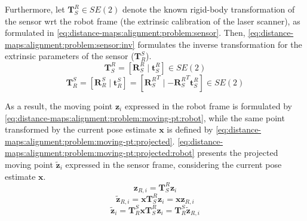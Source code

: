Furthermore, let $\mathbf{T}_S^R \in SE(2)$ denote the known rigid-body
transformation of the sensor \gls{wrt} the robot frame (the extrinsic
calibration of the laser scanner), as formulated in
\eqref{eq:distance-maps:alignment:problem:sensor}. Then,
\eqref{eq:distance-maps:alignment:problem:sensor:inv} formulates the inverse
transformation for the extrinsic parameters of the sensor ($\mathbf{T}_R^S$).
\begin{equation}
\label{eq:distance-maps:alignment:problem:sensor}
\mathbf{T}_S^R = \left[\mathbf{R}_S^R \mid \mathbf{t}_S^R\right] \in SE(2)
\end{equation}
\begin{equation}
\label{eq:distance-maps:alignment:problem:sensor:inv}
\mathbf{T}_R^S =
\left[\mathbf{R}_R^S \mid \mathbf{t}_R^S\right] =
\left[{\mathbf{R}_S^R}^T \mid -{\mathbf{R}_S^R}^T\mathbf{t}_S^R\right]
\in SE(2)
\end{equation}

As a result, the moving point $\mathbf{z}_i$ expressed in the robot frame is
formulated by \eqref{eq:distance-maps:alignment:problem:moving-pt:robot}, while
the same point transformed by the current pose estimate $\mathbf{x}$ is defined
by \eqref{eq:distance-maps:alignment:problem:moving-pt:projected}.
\eqref{eq:distance-maps:alignment:problem:moving-pt:projected:robot}
presents the projected moving point $\tilde{\mathbf{z}}_{i}$ expressed in the
sensor frame, considering the current pose estimate $\mathbf{x}$.
\begin{equation}
\label{eq:distance-maps:alignment:problem:moving-pt:robot}
\mathbf{z}_{R,i} = \mathbf{T}_S^R \mathbf{z}_i
\end{equation}
\begin{equation}
\label{eq:distance-maps:alignment:problem:moving-pt:projected}
\tilde{\mathbf{z}}_{R,i} = \mathbf{x} \mathbf{T}_S^R \mathbf{z}_i =
\mathbf{x} \mathbf{z}_{R,i}
\end{equation}
\begin{equation}
\label{eq:distance-maps:alignment:problem:moving-pt:projected:robot}
\tilde{\mathbf{z}}_{i} = \mathbf{T}_R^S \mathbf{x} \mathbf{T}_S^R \mathbf{z}_i =
\mathbf{T}_R^S \tilde{\mathbf{z}}_{R,i}
\end{equation}

